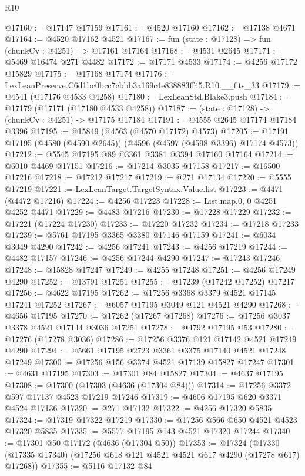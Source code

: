 \begin{lexlean}{R10}
\begin{coremodule}
@17160 := @17147 @17159
@17161 := @4520 @17160
@17162 := @17138 @4671
@17164 := @4520 @17162 @4521
@17167 := fun (state : @17128) => fun (chunkCv : @4251) => @17161 @17164
@17168 := @4531 @2645
@17171 := @5469 @16474 @271 @4482
@17172 := @17171 @4533
@17174 := @4256 @17172 @15829
@17175 := @17168 @17174
@17176 := LexLeanPreserve.C6d1bc0bcc7cbbb3a169c4e838883ff45.R10.__fits_33
@17179 := @4541 (@17176 @4533 @4258)
@17180 := LexLeanStd.Blake3.push
@17184 := @17179 (@17171 (@17180 @4533 @4258))
@17187 := (state : @17128) -> (chunkCv : @4251) -> @17175 @17184
@17191 := @4555 @2645 @17174 @17184 @3396
@17195 := @15849 (@4563 (@4570 @17172) @4573)
@17205 := @17191 @17195 (@4580 (@4590 @2645)) (@4596 (@4597 (@4598 @3396) @17174 @4573))
@17212 := @5545 @17195 @89 @3361 @3381 @3394 @17160 @17164
@17214 := @6010 @4469 @17151
@17216 := @17214 @3035 @17158
@17217 := @16500 @17216
@17218 := @17212 @17217
@17219 := @271 @17134
@17220 := @5555 @17219
@17221 := LexLeanTarget.TargetSyntax.Value.list
@17223 := @4471 (@4472 @17216)
@17224 := @4256 @17223
@17228 := List.map.{0, 0} @4251 @4252 @4471
@17229 := @4483 @17216
@17230 := @17228 @17229
@17232 := @17221 (@17224 @17230)
@17233 := @17220 @17232
@17234 := @17218 @17233
@17239 := @5761 @17195 @3365 @3380 @17146 @17159
@17241 := @6034 @3049 @4290
@17242 := @4256 @17241
@17243 := @4256 @17219
@17244 := @4482 @17157
@17246 := @4256 @17244 @4290
@17247 := @17243 @17246
@17248 := @15828 @17247
@17249 := @4255 @17248
@17251 := @4256 @17249 @4290
@17252 := @13791 @17251
@17255 := @17239 (@17242 @17252) @17217
@17256 := @4622 @17195
@17262 := @17256 @3368 @3379 @4521 @17145 @17241 @17252
@17267 := @6057 @17195 @3049 @121 @4521 @4290
@17268 := @4656 @17195
@17270 := @17262 (@17267 @17268)
@17276 := @17256 @3037 @3378 @4521 @17144 @3036 @17251
@17278 := @4792 @17195 @53
@17280 := @17276 (@17278 @3036)
@17286 := @17256 @3376 @121 @17142 @4521 @17249 @4290
@17294 := @5661 @17195 @2723 @3361 @3375 @17140 @4521 @17248 @17249
@17300 := @17256 @156 @3374 @4521 @17139 @15827 @17247
@17301 := @4631 @17195
@17303 := @17301 @84 @15827
@17304 := @4637 @17195
@17308 := @17300 (@17303 (@4636 (@17304 @84)))
@17314 := @17256 @3372 @597 @17137 @4523 @17219 @17246
@17319 := @4606 @17195 @620 @3371 @4524 @17136
@17320 := @271 @17132
@17322 := @4256 @17320 @5835
@17324 := @17319 @17322 @17219
@17330 := @17256 @566 @650 @4521 @4523 @17320 @5835
@17335 := @5577 @17195 @143 @4521 @17320 @17244
@17340 := @17301 @50 @17172 (@4636 (@17304 @50))
@17353 := @17324
    (@17330 (@17335 @17340) (@17256 @618 @121 @4521 @4521 @617 @4290 (@17278 @617) @17268))
@17355 := @5116 @17132 @84

\end{coremodule}
\end{lexlean}

